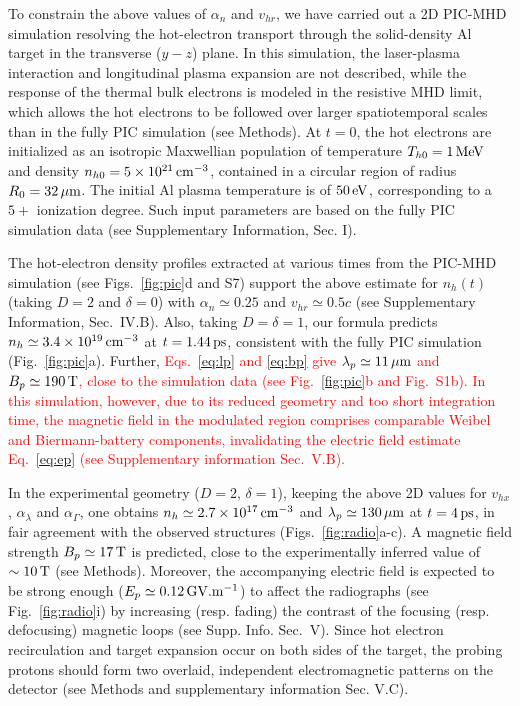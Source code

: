 \documentclass[aps,twocolumn,showpacs,superscriptaddress]{revtex4}
\begin{document}
To constrain the above values of $\alpha_n$ and $v_{hr}$, we have carried out a 2D PIC-MHD simulation resolving the hot-electron transport through the solid-density Al target in the transverse ($y-z$) plane. In this simulation, the laser-plasma interaction and longitudinal plasma expansion are not described, while the response of the thermal bulk electrons is modeled in the resistive MHD limit, which allows the hot electrons to be followed over larger spatiotemporal scales than in the fully PIC simulation (see Methods). At $t = 0$, the hot electrons are initialized as an isotropic Maxwellian population of temperature $T_{h0}=1\,\rm MeV$ and density $n_{h0}=5\times10^{21}\,\rm cm^{-3}$, contained in a circular region of radius $R_{0}=32\,\rm \mu m$. The initial Al plasma temperature is of $50\,\rm eV$, corresponding to a $5+$ ionization degree. Such input parameters are based on the fully PIC simulation data (see Supplementary Information, Sec. I).

The hot-electron density profiles extracted at various times from the PIC-MHD simulation (see Figs.~\ref{fig:pic}d and S7) support the above estimate for $n_h(t)$ (taking $D=2$ and $\delta=0$) with $\alpha_n \simeq 0.25$ and $v_{hr}\simeq 0.5c$ (see Supplementary Information, Sec.~IV.B). Also, taking $D=\delta=1$, our formula predicts $n_h \simeq 3.4 \times 10^{19}\,\rm cm^{-3}$ at $t=1.44\,\rm ps$, consistent with the fully PIC simulation (Fig.~\ref{fig:pic}a). Further, \textcolor{red}{Eqs.~\eqref{eq:lp} and \eqref{eq:bp} give $\lambda_p \simeq 11 \,\rm \mu m$ and $B_p \simeq 190\,\rm T$, close to the simulation data (see Fig.~\ref{fig:pic}b and Fig.~S1b). In this simulation, however, due to its reduced geometry and too short integration time, the magnetic field in the modulated region comprises comparable Weibel and Biermann-battery components, invalidating the electric field estimate Eq.~\eqref{eq:ep} (see Supplementary information Sec.~V.B).}

In the experimental geometry ($D=2$, $\delta=1$), keeping the above 2D values for $v_{hx}$, $\alpha_\lambda$ and $\alpha_\Gamma$, one obtains $n_h \simeq 2.7 \times 10^{17}\,\rm cm^{-3}$ and $\lambda_p \simeq 130\,\rm \mu m$ at $t=4\,\rm ps$, in fair agreement with the observed structures  (Figs.~\ref{fig:radio}a-c). A magnetic field strength $B_p \simeq 17\,\rm T$ is predicted, close to the experimentally inferred value of $\sim 10\,\rm T$ (see Methods). Moreover, the accompanying electric field is expected to be strong enough ($E_p \simeq 0.12 \,\rm GV.m^{-1}$) to affect the radiographs (see Fig.~\ref{fig:radio}i) by increasing (resp. fading) the contrast of the focusing (resp. defocusing) magnetic loops (see Supp. Info. Sec.~V). Since hot electron recirculation and target expansion occur on both sides of the target, the probing protons should form two overlaid, independent electromagnetic patterns on the detector (see Methods and supplementary information Sec. V.C). %
\end{document}
